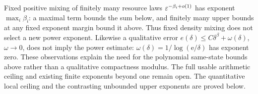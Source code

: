 Fixed positive mixing of finitely many resource laws $\varepsilon^{-\beta_i+o(1)}$ has exponent $\max_i\beta_i$: a maximal term bounds the sum below, and finitely many upper bounds at any fixed exponent margin bound it above. Thus fixed density mixing does not select a new power exponent. Likewise a qualitative error $e(\delta)\le C\delta^\beta+\omega(\delta)$, $\omega\to0$, does not imply the power estimate: $\omega(\delta)=1/\log(\mathrm e/\delta)$ has exponent zero. These observations explain the need for the polynomial same-state bounds above rather than a qualitative compactness modulus. The full usable arithmetic ceiling and existing finite exponents beyond one remain open. The quantitative local ceiling and the contrasting unbounded upper exponents are proved below.

